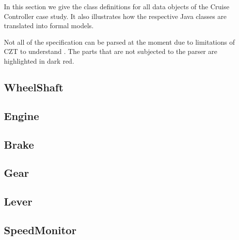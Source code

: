 \documentclass{article}
\newcommand{\reducevspaceaftersection}{\vspace{-1em}}
\begin{document}
In this section we give the {\OhCircus} class definitions for all data objects of the Cruise Controller case study. It also illustrates how the respective Java classes are translated into formal models.

Not all of the specification can be parsed at the moment due to limitations of CZT to understand {\OhCircus}. The parts that are not subjected to the parser are highlighted in dark red.

\subsection{WheelShaft}
\reducevspaceaftersection



\newpage

\subsection{Engine}
\reducevspaceaftersection



\newpage

\subsection{Brake}
\reducevspaceaftersection



\newpage

\subsection{Gear}
\reducevspaceaftersection



\newpage

\subsection{Lever}
\reducevspaceaftersection



\newpage

\subsection{SpeedMonitor}
\reducevspaceaftersection


\end{document}
